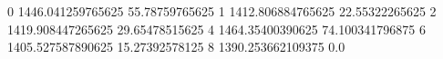 0 1446.041259765625 55.78759765625
1 1412.806884765625 22.55322265625
2 1419.908447265625 29.65478515625
4 1464.35400390625 74.100341796875
6 1405.527587890625 15.27392578125
8 1390.253662109375 0.0
